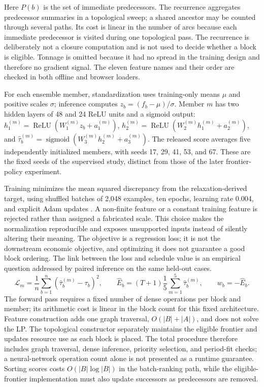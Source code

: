 \documentclass[11pt]{article}
\begin{document}
Here $P(b)$ is the set of immediate predecessors. The recurrence aggregates predecessor summaries in a topological sweep; a shared ancestor may be counted through several paths. Its cost is linear in the number of arcs because each immediate predecessor is visited during one topological pass. The recurrence is deliberately not a closure computation and is not used to decide whether a block is eligible. Tonnage is omitted because it had no spread in the training design and therefore no gradient signal. The eleven feature names and their order are checked in both offline and browser loaders.

For each ensemble member, standardization uses training-only means $\mu$ and positive scales $\sigma$; inference computes $z_b=(f_b-\mu)/\sigma$. Member $m$ has two hidden layers of 48 and 24 ReLU units and a sigmoid output: $h^{(m)}_1=\operatorname{ReLU}(W^{(m)}_1z_b+a^{(m)}_1)$, $h^{(m)}_2=\operatorname{ReLU}(W^{(m)}_2h^{(m)}_1+a^{(m)}_2)$, and $\hat{\tau}^{(m)}_b=\operatorname{sigmoid}(W^{(m)}_3h^{(m)}_2+a^{(m)}_3)$. The released score averages five independently initialized members, with seeds 17, 29, 41, 53, and 67. These are the fixed seeds of the supervised study, distinct from those of the later frontier-policy experiment.

Training minimizes the mean squared discrepancy from the relaxation-derived target, using shuffled batches of 2,048 examples, ten epochs, learning rate 0.004, and explicit Adam updates \cite{kingma}. A non-finite feature or a constant training feature is rejected rather than assigned a fabricated scale. This choice makes the normalization reproducible and exposes unsupported inputs instead of silently altering their meaning. The objective is a regression loss; it is not the downstream economic objective, and optimizing it does not guarantee a good block ordering. The link between the loss and schedule value is an empirical question addressed by paired inference on the same held-out cases.
\begin{equation}
\mathcal{L}_m=\frac{1}{n}\sum_{b=1}^{n}(\hat{\tau}^{(m)}_b-\tau_b)^2,
\qquad \hat E_b=(T+1)\frac{1}{5}\sum_{m=1}^{5}\hat{\tau}^{(m)}_b,
\qquad w_b=-\hat E_b.
\label{eq:training-loss-order}
\end{equation}
The forward pass requires a fixed number of dense operations per block and member; its arithmetic cost is linear in the block count for this fixed architecture. Feature construction adds one graph traversal, $O(|B|+|A|)$, and does not solve the LP. The topological constructor separately maintains the eligible frontier and updates resource use as each block is placed. The total procedure therefore includes graph traversal, dense inference, priority selection, and period-fit checks; a neural-network operation count alone is not presented as a runtime guarantee. Sorting scores costs $O(|B|\log |B|)$ in the batch-ranking path, while the eligible-frontier implementation must also update successors as predecessors are removed.
\end{document}

